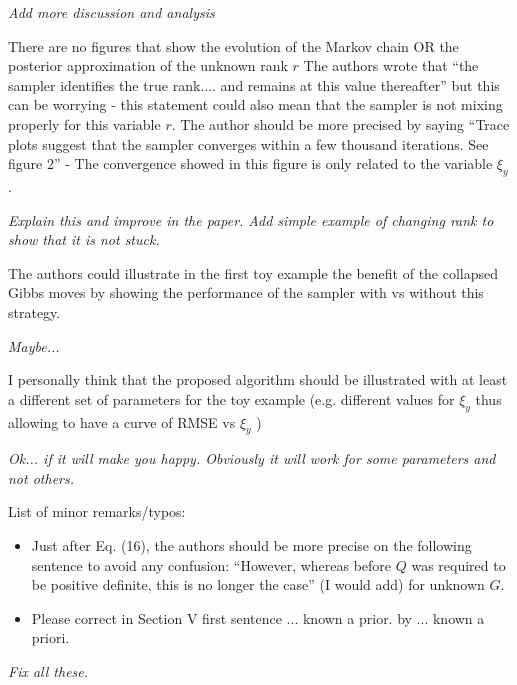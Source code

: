 \documentclass{article}
\newenvironment{review}[0]{\begin{itshape}\color{Gray}\noindent}{\end{itshape}\vspace{0.4cm}}
\newenvironment{response}[0]{\noindent}{\vspace{0.4cm}}
\newcommand{\meta}[1]{{\color{red}\em #1}}
\begin{document}
\begin{response}
 \meta{Add more discussion and analysis}
\end{response}

\begin{review}
There are no figures that show the evolution of the Markov chain OR the posterior approximation of the unknown rank $r$
The authors wrote that ``the sampler identifies the true rank.... and remains at this value thereafter'' but this can be worrying - this statement could also mean that the sampler is not mixing properly for this variable $r$. The author should be more precised by saying ``Trace plots suggest that the sampler converges within a few thousand iterations. See figure 2'' - The convergence showed in this figure is only related to the variable $\xi_y$.
\end{review}

\begin{response}
 \meta{Explain this and improve in the paper. Add simple example of changing rank to show that it is not stuck.}
\end{response}

\begin{review}
The authors could illustrate in the first toy example the benefit of the collapsed Gibbs
moves by showing the performance of the sampler with vs without this strategy.
\end{review}

\begin{response}
 \meta{Maybe...}
\end{response}

\begin{review}
I personally think that the proposed algorithm should be illustrated with at least a different set of parameters for the toy example (e.g. different values for $\xi_y$ thus allowing to have a curve of RMSE vs $\xi_y$ )
\end{review}

\begin{response}
 \meta{Ok... if it will make you happy. Obviously it will work for some parameters and not others.}
\end{response}

\begin{review}
List of minor remarks/typos:
\begin{itemize}
 \item Just after Eq. (16), the authors should be more precise on the following sentence to avoid any confusion: ``However, whereas before $Q$ was required to be positive definite, this is no longer the case'' (I would add) for unknown $G$.
 \item Please correct in Section V first sentence ... known a prior. by ... known a priori.
\end{itemize}
\end{review}

\begin{response}
 \meta{Fix all these.}
\end{response}
\end{document}
